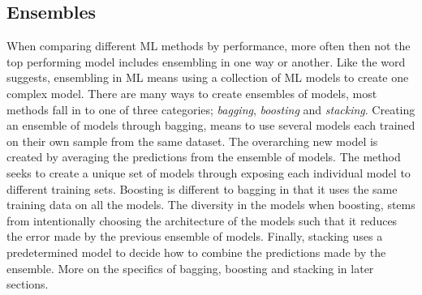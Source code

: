 \subsection{Ensembles}\label{subsec:Ensembles}
When comparing different \ac{ML} methods by performance, more often then not the top performing model includes 
ensembling in one way or another. Like the word suggests, ensembling in \ac{ML} means using a collection of 
\ac{ML} models to create one complex model. There are many ways to create ensembles of models, most methods 
fall in to one of three categories; \emph{bagging}, \emph{boosting} and \emph{stacking}. Creating an ensemble of models 
through bagging, means to use several models each trained on their own sample from the same dataset. The overarching 
new model is created by averaging the predictions from the ensemble of models. The method seeks to create a unique set of 
models through exposing each individual model to different training sets. Boosting is different to bagging in that it uses 
the same training data on all the models. The diversity in the models when boosting, stems from intentionally choosing the 
architecture of the models such that it reduces the error made by the previous ensemble of models. Finally, stacking uses 
a predetermined model to decide how to combine the predictions made by the ensemble. More on the specifics of bagging, 
boosting and stacking in later sections.  

  
